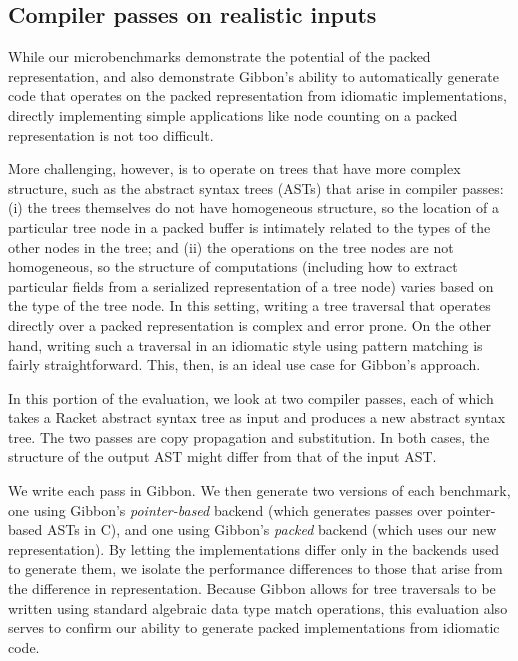 \documentclass[a4paper,english]{lipics-v2016}
\newcommand{\treelang}{Gibbon\xspace} %
\begin{document}
\subsection{Compiler passes on realistic inputs}

While our microbenchmarks demonstrate the potential of the packed
representation, and also demonstrate \treelang{}'s ability to automatically
generate code that operates on the packed representation from idiomatic
implementations, directly implementing simple applications like node counting
on a packed representation is not too difficult.

More challenging, however, is to operate on trees that have more complex
structure, such as the abstract syntax trees (ASTs) that arise in compiler
passes: (i) the trees themselves do not have homogeneous structure, so the
location of a particular tree node in a packed buffer is intimately related to
the types of the other nodes in the tree; and (ii) the operations on the tree
nodes are not homogeneous, so the structure of computations (including how to
extract particular fields from a serialized representation of a tree node)
varies based on the type of the tree node. In this setting, writing a tree
traversal that operates directly over a packed representation is complex and
error prone. On the other hand, writing such a traversal in an idiomatic style
using pattern matching is fairly straightforward. This, then, is an ideal use
case for \treelang{}'s approach.

In this portion of the evaluation, we look at two compiler passes, each of
which takes a Racket abstract syntax tree as input and produces a new abstract
syntax tree. The two passes are copy propagation and substitution. In both
cases, the structure of the output AST might differ from that of the input
AST.

We write each pass in \treelang{}. We then generate two versions of each
benchmark, one using \treelang{}'s {\em pointer-based} backend (which
generates passes over pointer-based ASTs in C), and one using \treelang{}'s
{\em packed} backend (which uses our new representation). By letting the
implementations differ only in the backends used to generate them, we isolate
the performance differences to those that arise from the difference in
representation. Because \treelang{} allows for tree traversals to be written
using standard algebraic data type match operations, this evaluation also
serves to confirm our ability to generate packed implementations from
idiomatic code.
\end{document}
